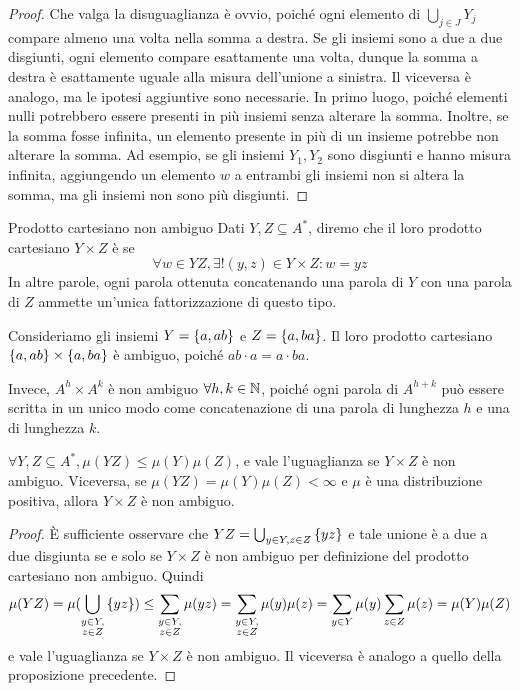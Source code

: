 \begin{proof}
  Che valga la disuguaglianza è ovvio, poiché ogni elemento di \(\bigcup_{j \in J}Y_j\) compare almeno una volta nella somma a destra.
  Se gli insiemi sono a due a due disgiunti, ogni elemento compare esattamente una volta, dunque la somma a destra è esattamente uguale alla misura dell'unione a sinistra.
  Il viceversa è analogo, ma le ipotesi aggiuntive sono necessarie.
  In primo luogo, poiché elementi nulli potrebbero essere presenti in più insiemi senza alterare la somma.
  Inoltre, se la somma fosse infinita, un elemento presente in più di un insieme potrebbe non alterare la somma.
  Ad esempio, se gli insiemi \(Y_1,Y_2\) sono disgiunti e hanno misura infinita, aggiungendo un elemento \(w\) a entrambi gli insiemi non si altera la somma, ma gli insiemi non sono più disgiunti.
\end{proof}

\begin{definition}{Prodotto cartesiano non ambiguo}
  Dati \(Y,Z \subseteq A^*\), diremo che il loro prodotto cartesiano \(Y\times Z\) è  se
    \[\forall w \in YZ, \exists! (y,z) \in Y \times Z : w = yz\]
  In altre parole, ogni parola ottenuta concatenando una parola di \(Y\) con una parola di \(Z\) ammette un'unica fattorizzazione di questo tipo.
\end{definition}

\begin{example}[label=ex:non_ambiguos_prod]{}
  Consideriamo gli insiemi \(Y = \set{a,ab}\) e \(Z = \set{a,ba}\).
  Il loro prodotto cartesiano \(\set{a,ab}\times\set{a,ba}\) è ambiguo, poiché \(ab\cdot a = a\cdot ba\).

  Invece, \(A^h\times A^k\) è non ambiguo \(\forall h,k \in \mathbb{N}\), poiché ogni parola di \(A^{h+k}\) può essere scritta in un unico modo come concatenazione di una parola di lunghezza \(h\) e una di lunghezza \(k\).
\end{example}
\begin{proposition}[label=prop:distribution_distributivity_over_product]{}
  \(\forall Y,Z \subseteq A^*, \mu(YZ) \leq \mu(Y)\mu(Z)\), e vale l'uguaglianza se \(Y\times Z\) è non ambiguo.
  Viceversa, se \(\mu(YZ) = \mu(Y)\mu(Z) < \infty\) e \(\mu\) è una distribuzione positiva, allora \(Y\times Z\) è non ambiguo.
\end{proposition}
\begin{proof}
  È sufficiente osservare che \(YZ = \bigcup_{y\in Y, z \in Z}\set{yz}\) e tale unione è a due a due disgiunta se e solo se \(Y\times Z\) è non ambiguo per definizione del prodotto cartesiano non ambiguo.
  Quindi
  \[\mu(YZ) = \mu(\bigcup_{\substack{y\in Y,\\ z \in Z}}\set{yz}) \leq \sum_{\substack{y\in Y,\\ z \in Z}}\mu(yz) = \sum_{\substack{y\in Y,\\ z \in Z}}\mu(y)\mu(z) =\sum_{y \in Y}\mu(y) \sum_{z \in Z}\mu(z) = \mu(Y)\mu(Z)\]
  e vale l'uguaglianza se \(Y\times Z\) è non ambiguo.
  Il viceversa è analogo a quello della proposizione precedente.
\end{proof}

